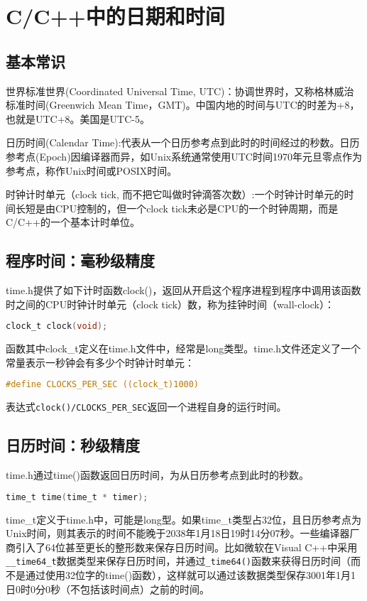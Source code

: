 \section{C/C++中的日期和时间}

\subsection{基本常识}

世界标准世界(Coordinated Universal Time, UTC)：协调世界时，又称格林威治标准时间(Greenwich Mean Time，GMT)。中国内地的时间与UTC的时差为+8，也就是UTC+8。美国是UTC-5。 

日历时间(Calendar Time):代表从一个日历参考点到此时的时间经过的秒数。日历参考点(Epoch)因编译器而异，如Unix系统通常使用UTC时间1970年元旦零点作为参考点，称作Unix时间或POSIX时间。

时钟计时单元（clock tick, 而不把它叫做时钟滴答次数）:一个时钟计时单元的时间长短是由CPU控制的，但一个clock tick未必是CPU的一个时钟周期，而是C/C++的一个基本计时单位。


\subsection{程序时间：毫秒级精度}
time.h提供了如下计时函数clock()，返回从开启这个程序进程到程序中调用该函数时之间的CPU时钟计时单元（clock tick）数，称为挂钟时间（wall-clock）：
\begin{lstlisting}[language=C]
clock_t clock(void);
\end{lstlisting}

函数其中clock\_t定义在time.h文件中，经常是long类型。time.h文件还定义了一个常量表示一秒钟会有多少个时钟计时单元： 
\begin{lstlisting}[language=C]
#define CLOCKS_PER_SEC ((clock_t)1000) 
\end{lstlisting}
表达式\verb|clock()/CLOCKS_PER_SEC|返回一个进程自身的运行时间。

\subsection{日历时间：秒级精度}
time.h通过time()函数返回日历时间，为从日历参考点到此时的秒数。
\begin{lstlisting}[language=C]
time_t time(time_t * timer); 
\end{lstlisting}

time\_t定义于time.h中，可能是long型。如果time\_t类型占32位，且日历参考点为Unix时间，则其表示的时间不能晚于2038年1月18日19时14分07秒。一些编译器厂商引入了64位甚至更长的整形数来保存日历时间。比如微软在Visual C++中采用\verb+__time64_t+数据类型来保存日历时间，并通过\verb|_time64()|函数来获得日历时间（而不是通过使用32位字的time()函数），这样就可以通过该数据类型保存3001年1月1日0时0分0秒（不包括该时间点）之前的时间。 

